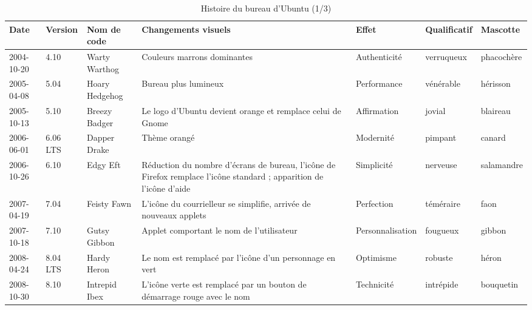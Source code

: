 \documentclass{FramateX}
\begin{document}
\begin{refsection}
\begin{landscape}
\begin{table}
\centering
\begin{scriptsize}
\begin{tabularx}{15cm}{|p{1.5cm}|p{1cm}|p{1.5cm}|X|p{2cm}|p{2cm}|p{1.5cm}|}
\hline
 \textbf{Date} &  \textbf{Version}  & \textbf{Nom de code}  & \textbf{Changements visuels}  &  \textbf{Effet}  &  \textbf{Qualificatif}  & \textbf{Mascotte} \\
\hline
 2004-10-20  &  4.10  &  Warty Warthog  & Couleurs marrons dominantes  &  Authenticité  &  verruqueux  &  phacochère \\
\hline
 2005-04-08  &  5.04  &  Hoary Hedgehog  & Bureau plus lumineux  &  Performance  &  vénérable  & hérisson \\
\hline
 2005-10-13  &  5.10  &  Breezy Badger  & Le logo d'Ubuntu devient orange et remplace celui de Gnome  &  Affirmation  & jovial  & blaireau \\
\hline
 2006-06-01  &  6.06 LTS  &  Dapper Drake  & Thème orangé  &  Modernité  &  pimpant  &  canard \\
\hline
 2006-10-26  &  6.10  &  Edgy Eft  & Réduction du nombre d'écrans de bureau, l'icône de Firefox remplace l'icône standard ; apparition de l'icône d'aide  &  Simplicité  &  nerveuse  & salamandre \\
\hline
 2007-04-19  &  7.04  &  Feisty Fawn  & L'icône du courrielleur se simplifie, arrivée de nouveaux applets  &  Perfection  &  téméraire  & faon \\
\hline
 2007-10-18  &  7.10  &  Gutsy Gibbon  & Applet comportant le nom de l'utilisateur  &  Personnalisation  &  fougueux  & gibbon \\
\hline
 2008-04-24  &  8.04 LTS  &  Hardy Heron  & Le nom est remplacé par l'icône d'un personnage en vert  &  Optimisme  &  robuste  & héron \\
 \hline
  2008-10-30  &  8.10  &  Intrepid Ibex  & L'icône verte est remplacé par un bouton de démarrage rouge avec le nom & Technicité  & intrépide  & bouquetin \\
\hline
\end{tabularx}
\end{scriptsize}
\caption{Histoire du bureau d'Ubuntu (1/3)}
\end{table}
\end{landscape}





\end{refsection}
\end{document}
